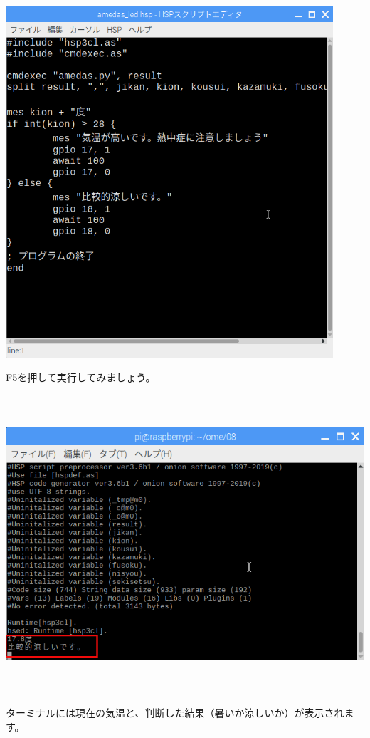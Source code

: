 \documentclass[a4paper,12pt,dvipdfmx]{jarticle}
\begin{document}
\begin{center}
\includegraphics[width=12.173cm,height=13.063cm]{textbook-img038.png}

\end{center}

\bigskip


\bigskip

\clearpage
F5を押して実行してみましょう。



\begin{center}
\includegraphics[width=17.006cm,height=11.077cm]{textbook-img039.png}

\end{center}
ターミナルには現在の気温と、判断した結果（暑いか涼しいか）が表示されます。
\end{document}
